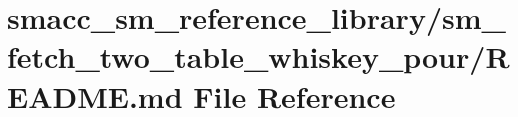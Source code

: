 \hypertarget{smacc__sm__reference__library_2sm__fetch__two__table__whiskey__pour_2README_8md}{}\section{smacc\+\_\+sm\+\_\+reference\+\_\+library/sm\+\_\+fetch\+\_\+two\+\_\+table\+\_\+whiskey\+\_\+pour/\+R\+E\+A\+D\+ME.md File Reference}
\label{smacc__sm__reference__library_2sm__fetch__two__table__whiskey__pour_2README_8md}
